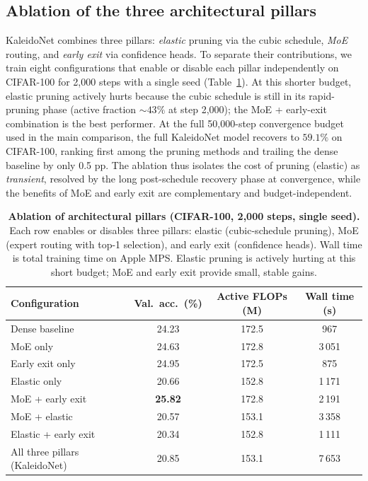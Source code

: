 \documentclass[fleqn,10pt]{article}
\begin{document}
\subsection*{Ablation of the three architectural pillars}

KaleidoNet combines three pillars: \emph{elastic} pruning via the
cubic schedule, \emph{MoE} routing, and \emph{early exit} via
confidence heads. To separate their contributions, we train eight
configurations that enable or disable each pillar independently on
CIFAR-100 for 2{,}000 steps with a single seed (Table~\ref{tab:ablation}).
At this shorter budget, elastic pruning actively hurts because the
cubic schedule is still in its rapid-pruning phase (active fraction
$\sim\!43\%$ at step 2{,}000); the MoE + early-exit combination is
the best performer. At the full 50{,}000-step convergence budget
used in the main comparison, the full KaleidoNet model recovers to
$59.1\%$ on CIFAR-100, ranking first among the pruning methods and
trailing the dense baseline by only 0.5 pp. The ablation thus
isolates the cost of pruning (elastic) as \emph{transient}, resolved
by the long post-schedule recovery phase at convergence, while the
benefits of MoE and early exit are complementary and
budget-independent.

\begin{table}[t]
\centering
\caption{\textbf{Ablation of architectural pillars (CIFAR-100,
2{,}000 steps, single seed).} Each row enables or disables three
pillars: elastic (cubic-schedule pruning), MoE (expert routing with
top-1 selection), and early exit (confidence heads). Wall time is
total training time on Apple MPS. Elastic pruning is actively hurting
at this short budget; MoE and early exit provide small, stable gains.}
\label{tab:ablation}
\small
\begin{tabular}{lccc}
\toprule
\textbf{Configuration} & \textbf{Val.\ acc.\ (\%)}
 & \textbf{Active FLOPs (M)} & \textbf{Wall time (s)} \\
\midrule
Dense baseline                & 24.23 & 172.5 & 967   \\
MoE only                      & 24.63 & 172.8 & 3\,051 \\
Early exit only               & 24.95 & 172.5 & 875   \\
Elastic only                  & 20.66 & 152.8 & 1\,171 \\
MoE + early exit              & \textbf{25.82} & 172.8 & 2\,191 \\
MoE + elastic                 & 20.57 & 153.1 & 3\,358 \\
Elastic + early exit          & 20.34 & 152.8 & 1\,111 \\
All three pillars (KaleidoNet)& 20.85 & 153.1 & 7\,653 \\
\bottomrule
\end{tabular}
\end{table}
\end{document}
